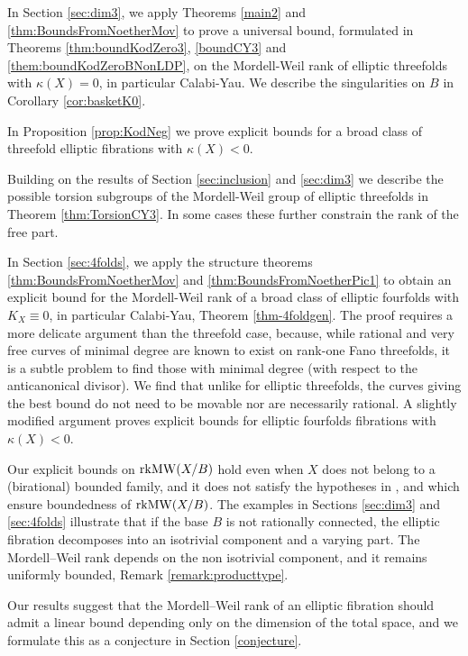 \documentclass[11pt]{amsart}
\theoremstyle{definition}
\theoremstyle{definition}
\theoremstyle{remark}
\theoremstyle{remark}
\theoremstyle{definition}
\theoremstyle{conjecture}
\newcommand{\MW}{\mathrm{MW}}
\begin{document}
 In Section \ref{sec:dim3}, we apply  Theorems \ref{main2} and  \ref{thm:BoundsFromNoetherMov} to prove a universal bound, formulated in Theorems \ref{thm:boundKodZero3},  \ref{boundCY3} and \ref{them:boundKodZeroBNonLDP}, on the Mordell-Weil rank of  elliptic 
 threefolds with  $\kappa(X) = 0$, in particular Calabi-Yau. We describe the singularities on $B$ in Corollary \ref{cor:basketK0}.
   
   In  Proposition \ref{prop:KodNeg} we prove explicit bounds for a broad class of  threefold elliptic fibrations with $\kappa(X) < 0$. 
  \color{black}
 
  
Building on the results of Section  \ref{sec:inclusion} and \ref{sec:dim3} we describe the possible torsion subgroups of the Mordell-Weil group of elliptic threefolds in Theorem \ref{thm:TorsionCY3}. In some cases these further constrain 
the rank of the free part. 

\color{black}
In Section \ref{sec:4folds}, we apply the structure theorems  \ref{thm:BoundsFromNoetherMov} and \ref{thm:BoundsFromNoetherPic1} to obtain an explicit bound for the Mordell-Weil rank of a broad class of elliptic  fourfolds with $K_X \equiv 0$, in particular Calabi-Yau, Theorem \ref{thm-4foldgen}.   The proof requires a more delicate argument than the threefold case, because, while rational and very free curves of  minimal degree are known to exist on rank-one Fano threefolds, it is a subtle problem to find those with minimal degree (with respect to the anticanonical divisor). We find that unlike for elliptic threefolds,  the curves giving the best bound  do not need to be  movable nor are necessarily rational. A slightly modified argument proves explicit bounds for elliptic   fourfolds fibrations with $\kappa(X) < 0$.


Our  explicit bounds on ${\rm rk} \MW(X/B)$ hold  even when  $X$ does not belong to a (birational) bounded family, and  it does not satisfy the hypotheses in  \cite{Filipazzi:2021dcw}, \cite{DiCerboSvaldi} and \cite{Birkar_2024}  which ensure boundedness of ${\rm rk} \MW(X/B)$. 
The examples in Sections \ref{sec:dim3} and \ref{sec:4folds} illustrate that if  the base $B$ is not  rationally connected, the elliptic fibration decomposes  
into an  isotrivial component and a  varying part. 
The Mordell{--}Weil rank depends on the non isotrivial component, and it remains uniformly bounded, 
Remark \ref{remark:producttype}. 
\color{black}

Our results suggest that the Mordell{--}Weil rank of an elliptic fibration should admit a linear bound depending only on the dimension of the total space, and we formulate this as a conjecture in Section \ref{conjecture}. 
\end{document}
